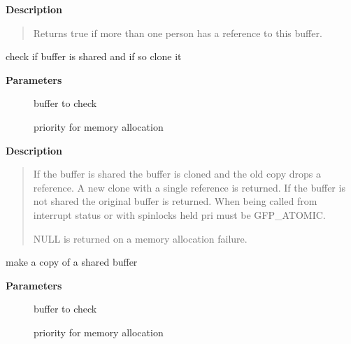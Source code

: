 \documentclass[a4paper,8pt,english]{sphinxmanual}
\begin{document}
\textbf{Description}
\begin{quote}

Returns true if more than one person has a reference to this
buffer.
\end{quote}

\begin{fulllineitems}
\label{networking/kapi:c.skb_share_check}
check if buffer is shared and if so clone it

\end{fulllineitems}


\textbf{Parameters}
\begin{description}
\item[{}] \leavevmode
buffer to check

\item[{}] \leavevmode
priority for memory allocation

\end{description}

\textbf{Description}
\begin{quote}

If the buffer is shared the buffer is cloned and the old copy
drops a reference. A new clone with a single reference is returned.
If the buffer is not shared the original buffer is returned. When
being called from interrupt status or with spinlocks held pri must
be GFP\_ATOMIC.

NULL is returned on a memory allocation failure.
\end{quote}

\begin{fulllineitems}
\label{networking/kapi:c.skb_unshare}
make a copy of a shared buffer

\end{fulllineitems}


\textbf{Parameters}
\begin{description}
\item[{}] \leavevmode
buffer to check

\item[{}] \leavevmode
priority for memory allocation

\end{description}
\end{document}
